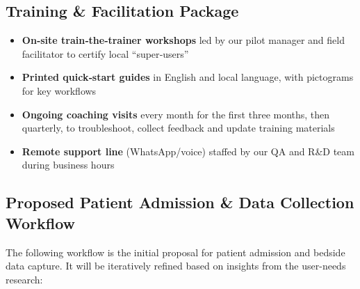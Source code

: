 \documentclass[a4paper,11pt]{article}
\begin{document}
\subsection{Training & Facilitation Package}
\begin{itemize}
\item \textbf{On‑site train‑the‑trainer workshops} led by our pilot manager and field facilitator to certify local “super‑users”
\item \textbf{Printed quick‑start guides} in English and local language, with pictograms for key workflows
\item \textbf{Ongoing coaching visits} every month for the first three months, then quarterly, to troubleshoot, collect feedback and update training materials
\item \textbf{Remote support line} (WhatsApp/voice) staffed by our QA and R&D team during business hours
\end{itemize}
\subsection{Proposed Patient Admission \& Data Collection Workflow}

The following workflow is the initial proposal for patient admission and bedside data capture.  It will be iteratively refined based on insights from the user-needs research:
\end{document}
